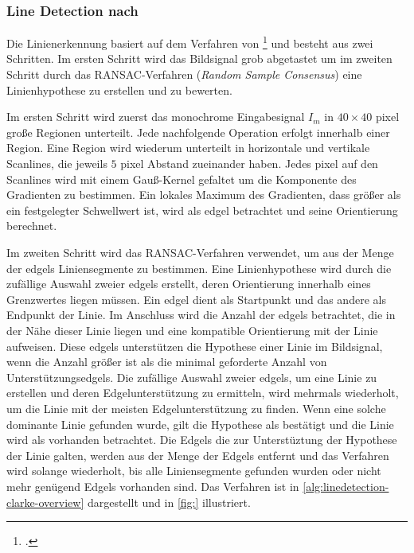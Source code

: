 \subsubsection{Line Detection nach \citeauthor{clarke96}} %
\label{sub:line_detection_clarke}
Die Linienerkennung basiert auf dem Verfahren von \citeauthor{clarke96}\footcite{clarke96} und besteht aus zwei
 Schritten. Im ersten Schritt wird das Bildsignal grob abgetastet um im zweiten Schritt durch das RANSAC-Verfahren
 (\textit{Random Sample Consensus}) eine Linienhypothese zu erstellen und zu bewerten.

Im ersten Schritt wird zuerst das monochrome Eingabesignal $I_m$ in $40 \times 40$ \gls{pixel} große Regionen
 unterteilt. Jede nachfolgende Operation erfolgt innerhalb einer Region. Eine Region wird wiederum unterteilt in
 horizontale und vertikale Scanlines, die jeweils $5$ \gls{pixel} Abstand zueinander haben. Jedes \gls{pixel} auf den
 Scanlines wird mit einem Gauß-Kernel gefaltet um die Komponente des Gradienten zu bestimmen. Ein lokales Maximum des
 Gradienten, dass größer als ein festgelegter Schwellwert ist, wird als \gls{edgel} betrachtet und seine Orientierung
 berechnet.

Im zweiten Schritt wird das RANSAC-Verfahren verwendet, um aus der Menge der \glspl{edgel} Liniensegmente zu bestimmen.
 Eine Linienhypothese wird durch die zufällige Auswahl zweier \glspl{edgel} erstellt, deren Orientierung innerhalb
 eines Grenzwertes liegen müssen. Ein \gls{edgel} dient als Startpunkt und das andere als Endpunkt der Linie. Im
 Anschluss wird die Anzahl der \glspl{edgel} betrachtet, die in der Nähe dieser Linie liegen und eine kompatible
 Orientierung mit der Linie aufweisen. Diese \glspl{edgel} unterstützen die Hypothese einer Linie im Bildsignal, wenn
 die Anzahl größer ist als die minimal geforderte Anzahl von Unterstützungsedgels. Die zufällige Auswahl zweier
 \glspl{edgel}, um eine Linie zu erstellen und deren Edgelunterstützung zu ermitteln, wird mehrmals wiederholt, um die
 Linie mit der meisten Edgelunterstützung zu finden. Wenn eine solche dominante Linie gefunden wurde, gilt die
 Hypothese als bestätigt und die Linie wird als vorhanden betrachtet. Die Edgels die zur Unterstüztung der Hypothese
 der Linie galten, werden aus der Menge der Edgels entfernt und das Verfahren wird solange wiederholt, bis alle
 Liniensegmente gefunden wurden oder nicht mehr genügend Edgels vorhanden sind. Das Verfahren ist in
 \autoref{alg:linedetection-clarke-overview} dargestellt und in \autoref{fig:} illustriert.


